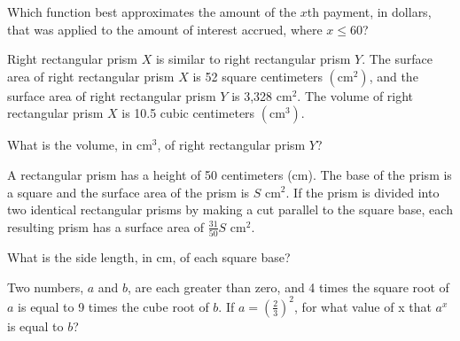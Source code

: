 Which function best approximates the amount of the \(x\)th payment, in dollars, that was applied to the amount of interest accrued, where \(x \leq 60\)?

\vspace{0.75em}



\vspace{2em}

\noindent\markforreview
\vspace{1em}

Right rectangular prism \(X\) is similar to right rectangular prism \(Y\).  
The surface area of right rectangular prism \(X\) is 52 square centimeters \((\text{cm}^2)\), and the surface area of right rectangular prism \(Y\) is 3,328 \(\text{cm}^2\).  
The volume of right rectangular prism \(X\) is 10.5 cubic centimeters \((\text{cm}^3)\).  

What is the volume, in \(\text{cm}^3\), of right rectangular prism \(Y\)?

\vspace{0.75em}




\noindent\markforreview
\vspace{1em}

A rectangular prism has a height of 50 centimeters (cm). The base of the prism is a square and the surface area of the prism is \( S \) cm\(^2\).  
If the prism is divided into two identical rectangular prisms by making a cut parallel to the square base, each resulting prism has a surface area of \(\frac{31}{50} S\) cm\(^2\).  

What is the side length, in cm, of each square base?

\vspace{0.75em}

\vspace{2em}

\noindent\markforreview
\vspace{1em}

Two numbers, \( a \) and \( b \), are each greater than zero, and 4 times the square root of \( a \) is equal to 9 times the cube root of \( b \).  
If \( a = \left(\frac{2}{3}\right)^2 \), for what value of x that \( a^x \) is equal to \( b \)?

